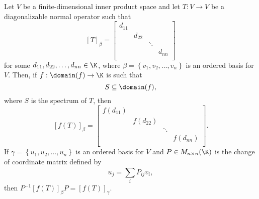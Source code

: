 \documentclass[linearalgebra]{subfiles}
\begin{document}
    \begin{cor}{}
        Let $V$ be a finite-dimensional inner product space and let $T:V\to V$ be a diagonalizable normal operator such that
        \begin{equation*}
            \left[ T \right] _\beta = 
            \begin{bmatrix}
                d_{11}& & & \\
                & d_{22} & & \\
                & & \ddots& \\
                & & & d_{nn}\\
            \end{bmatrix}
        \end{equation*}
        for some $d_{11}, d_{22}, \ldots, d_{nn}\in\K$, where $\beta = \left\lbrace v_1,v_2,\ldots,v_n \right\rbrace$ is an ordered basis for $V$. Then, if $f:\domain(f)\to\K$ is such that
        \begin{equation*}
            S\subseteq\domain(f),
        \end{equation*}
        where $S$ is the spectrum of $T$, then
        \begin{equation*}
            \left[ f(T) \right] _\beta = 
            \begin{bmatrix}
                f\left( d_{11} \right) & & & \\
                & f\left( d_{22} \right) & & \\
                & & \ddots& \\
                & & & f\left( d_{nn} \right) \\
            \end{bmatrix}.
        \end{equation*}
        If $\gamma = \left\lbrace u_1,u_2,\ldots,u_n \right\rbrace$ is an ordered basis for $V$ and $P\in M_{n\times n}(\K)$ is the change of coordinate matrix defined by
        \begin{equation*}
            u_j = \sum^{}_{i} P_{ij}v_i,
        \end{equation*}
        then $P^{-1}\left[ f(T) \right] _\beta P = \left[ f(T) \right] _\gamma$.
    \end{cor}	
\end{document}
